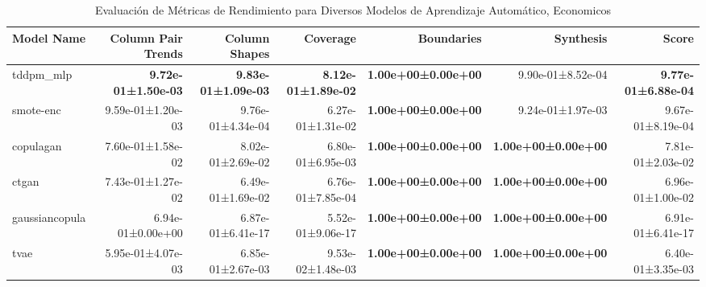 \begin{table}[H]
\centering
\fontsize{7}{14}\selectfont
\caption{Evaluación de Métricas de Rendimiento para Diversos Modelos de Aprendizaje Automático, Economicos}
\label{table-score-economicos-a}
\begin{tabular}{|l|r|r|r|r|r|r|}
\hline
 \rowcolor[gray]{0.8}
Model Name & Column Pair Trends & Column Shapes & Coverage & Boundaries & Synthesis & \textbf{Score} \\
\hline tddpm\_mlp & \bfseries 9.72e-01±1.50e-03 & \bfseries 9.83e-01±1.09e-03 & \bfseries 8.12e-01±1.89e-02 & \bfseries 1.00e+00±0.00e+00 & 9.90e-01±8.52e-04 & \bfseries 9.77e-01±6.88e-04 \\
\hline smote-enc & 9.59e-01±1.20e-03 & 9.76e-01±4.34e-04 & 6.27e-01±1.31e-02 & \bfseries 1.00e+00±0.00e+00 & 9.24e-01±1.97e-03 & 9.67e-01±8.19e-04 \\
\hline copulagan & 7.60e-01±1.58e-02 & 8.02e-01±2.69e-02 & 6.80e-01±6.95e-03 & \bfseries 1.00e+00±0.00e+00 & \bfseries 1.00e+00±0.00e+00 & 7.81e-01±2.03e-02 \\
\hline ctgan & 7.43e-01±1.27e-02 & 6.49e-01±1.69e-02 & 6.76e-01±7.85e-04 & \bfseries 1.00e+00±0.00e+00 & \bfseries 1.00e+00±0.00e+00 & 6.96e-01±1.00e-02 \\
\hline gaussiancopula & 6.94e-01±0.00e+00 & 6.87e-01±6.41e-17 & 5.52e-01±9.06e-17 & \bfseries 1.00e+00±0.00e+00 & \bfseries 1.00e+00±0.00e+00 & 6.91e-01±6.41e-17 \\
\hline tvae & 5.95e-01±4.07e-03 & 6.85e-01±2.67e-03 & 9.53e-02±1.48e-03 & \bfseries 1.00e+00±0.00e+00 & \bfseries 1.00e+00±0.00e+00 & 6.40e-01±3.35e-03 \\
\hline
\end{tabular}
\end{table}
